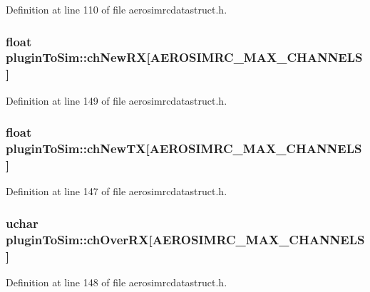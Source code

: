 \-Definition at line 110 of file aerosimrcdatastruct.\-h.

\hypertarget{group___aero_sim_r_c_gaa465d9eaa30d7a906bd3672768e5b380}{
\subsubsection[{ch\-New\-R\-X}]{\setlength{\rightskip}{0pt plus 5cm}float {\bf plugin\-To\-Sim\-::ch\-New\-R\-X}\mbox{[}{\bf \-A\-E\-R\-O\-S\-I\-M\-R\-C\-\_\-\-M\-A\-X\-\_\-\-C\-H\-A\-N\-N\-E\-L\-S}\mbox{]}}}\label{group___aero_sim_r_c_gaa465d9eaa30d7a906bd3672768e5b380}


\-Definition at line 149 of file aerosimrcdatastruct.\-h.

\hypertarget{group___aero_sim_r_c_ga69be322d9251f2d0881402e3bb8b79cc}{
\subsubsection[{ch\-New\-T\-X}]{\setlength{\rightskip}{0pt plus 5cm}float {\bf plugin\-To\-Sim\-::ch\-New\-T\-X}\mbox{[}{\bf \-A\-E\-R\-O\-S\-I\-M\-R\-C\-\_\-\-M\-A\-X\-\_\-\-C\-H\-A\-N\-N\-E\-L\-S}\mbox{]}}}\label{group___aero_sim_r_c_ga69be322d9251f2d0881402e3bb8b79cc}


\-Definition at line 147 of file aerosimrcdatastruct.\-h.

\hypertarget{group___aero_sim_r_c_ga3fe5834da184407de8227a046d5a7de7}{
\subsubsection[{ch\-Over\-R\-X}]{\setlength{\rightskip}{0pt plus 5cm}uchar {\bf plugin\-To\-Sim\-::ch\-Over\-R\-X}\mbox{[}{\bf \-A\-E\-R\-O\-S\-I\-M\-R\-C\-\_\-\-M\-A\-X\-\_\-\-C\-H\-A\-N\-N\-E\-L\-S}\mbox{]}}}\label{group___aero_sim_r_c_ga3fe5834da184407de8227a046d5a7de7}


\-Definition at line 148 of file aerosimrcdatastruct.\-h.

